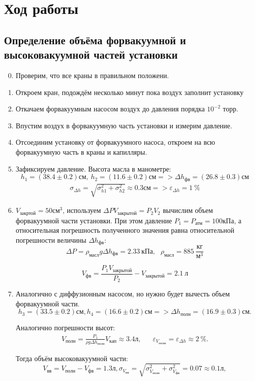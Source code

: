 \documentclass[11pt,a4paper]{article}
\begin{document}
\section*{Ход работы}
\subsection*{Определение объёма форвакуумной и высоковакуумной
частей установки}
\begin{enumerate}
  \setcounter{enumi}{-1}
  \item Проверим, что все краны в правильном положени.
  \item Откроем кран, подождём несколько минут пока воздух заполнит установку
  \item Откачаем форвакуумным насосом воздух до давления порядка $10^{-2}$ торр.
  \item Впустим воздух в форвакуумную часть установки и измерим давление.
  \item Отсоединим установку от форвакуумного насоса, откроем на всю форвакуумную часть
 в краны и капилляры.
 
  \item Зафиксируем давление. Высота масла в манометре: 
   \[ h_1 = (38.4 \pm 0.2)\text{см},\  h_2 = (11.6 \pm 0.2) \text{см} => \Delta h_\text{фв} = (26.8 \pm 0.3) \text{см}\]
  \begin{align}
    \sigma_{\Delta h} = \sqrt{\sigma_{h1}^2 + \sigma_{h2}^2}\approx 0.3 \text{см} => \varepsilon_{\Delta h} = 1 \ \% 
  \end{align}
  
  
  \item $V_\text{закртой} = 50 \text{см}^3$, используем $\Delta P V_\text{закрытой}=P_2 V_2$ вычислим объем форвакуумной части установки. 
  При этом давление $P_1 = P_\text{атм} = 100 \text{кПа}$, а относительная погрешность полученного 
  значения равна относительной погрешности величины $\Delta h_\text{фв} $:
  \[\Delta P = \rho_\text{масл} g \Delta h_\text{фв} = 2.33 \ \text{кПа}, \ \ \  \rho_\text{масл} = 885 \ \frac{\text{кг}}{\text{м}^3}\]
  
  \begin{equation}
    V_\text{фв} = \frac{P_1 V_\text{закрытой}}{P_2} - V_\text{закрытой} = 2.1 \ \text{л}
  \end{equation}
  

  \item Аналогично с диффузионным насосом, но нужно будет вычесть объем форвакуумной части. 
 \[
    h_3 = (33.5 \pm 0.2) \text{см}, h_4 = (16.6 \pm 0.2) \text{см} => \Delta h_{полн} = (16.9 \pm 0.3) \text{см}.
\]

  
  Аналогично погрешности высот:
  \begin{align}
    V_\text{полн} = \frac{P_1}{\rho g \Delta h_\text{полн}} V_{кап} \approx 3.4\text{л},&&
    \varepsilon_{V_{полн}} = \varepsilon_{\Delta h} \approx 2~\%.
  \end{align}
  
  Тогда объём высоковакуумной части:
  \[
    V_\text{вв} = V_\text{полн} - V_\text{фв} = 1.3\text{л}, \sigma_{V_\text{вв}} = \sqrt{\sigma_{V_\text{полн}}^2+ \sigma_{V_\text{фв}}^2} = 0.07 \approx 0.1\text{л},
  \]
\end{enumerate}
\end{document}

